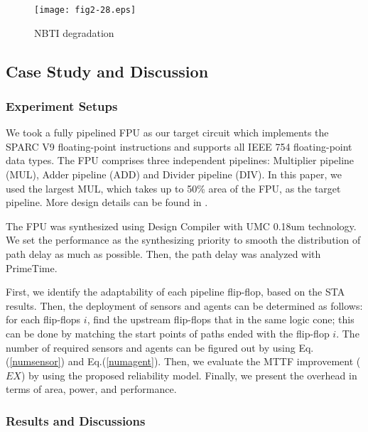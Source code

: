 \begin{figure}[t]
\centering
\texttt{[image: fig2-28.eps]}%
\vspace{-0.3cm}
   \caption{NBTI degradation}\label{nbti}
\end{figure}

\subsection{Case Study and Discussion}\label{section_casestudy}
\subsubsection{Experiment Setups}
We took a fully pipelined FPU \cite{OpenSPARC_06} as our target circuit which implements the SPARC V9 floating-point instructions and supports all IEEE 754 floating-point data types. The FPU comprises three independent pipelines: Multiplier pipeline (MUL), Adder pipeline (ADD) and Divider pipeline (DIV). In this paper, we used the largest MUL, which takes up to 50\% area of the FPU, as the target pipeline. More design details can be found in \cite{OpenSPARC_06}.

The FPU was synthesized using Design Compiler with UMC
0.18um technology. We set the performance as the synthesizing priority to smooth the distribution
of path delay as much as possible. Then, the path delay was analyzed with PrimeTime.

First, we identify the adaptability of each pipeline flip-flop, based on the STA results. Then, the
deployment of sensors and agents can be determined as follows: for each flip-flops $i$, find the
upstream flip-flops that in the same logic cone; this can be done by matching the start points of
paths ended with the flip-flop $i$. The number of required sensors and agents can be figured out by
using Eq.(\ref{numsensor}) and Eq.(\ref{numagent}).
Then, we evaluate the MTTF improvement ($EX$) by using the proposed reliability model.
Finally, we present the overhead in terms of area, power, and performance.

\subsubsection{Results and Discussions}\label{section_results}

